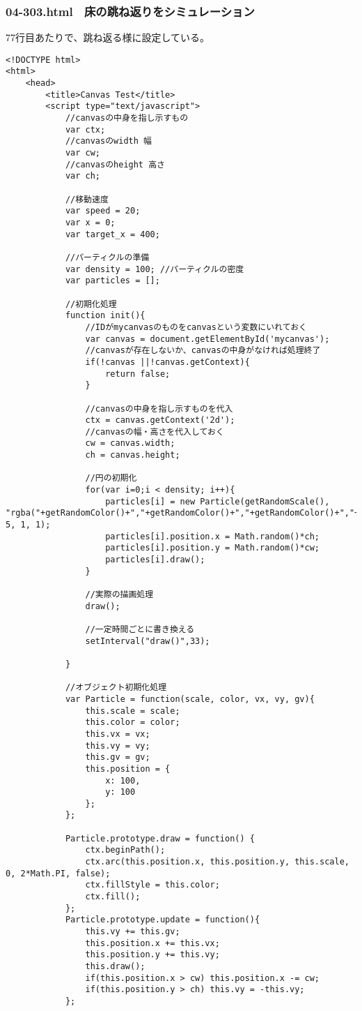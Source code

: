 \documentclass[mingoth,11pt,a4j,uplatex]{jsarticle}
\begin{document}
\subsubsection{04-303.html　床の跳ね返りをシミュレーション}
77行目あたりで、跳ね返る様に設定している。
\begin{lstlisting}[caption=床の跳ね返りをシミュレーション]
<!DOCTYPE html>
<html>
	<head>
		<title>Canvas Test</title>
		<script type="text/javascript">
			//canvasの中身を指し示すもの
			var ctx;
			//canvasのwidth 幅
			var cw;
			//canvasのheight 高さ
			var ch;
			
			//移動速度
			var speed = 20;
			var x = 0;
			var target_x = 400;
			
			//パーティクルの準備
			var density = 100; //パーティクルの密度
			var particles = [];
			
			//初期化処理
			function init(){
				//IDがmycanvasのものをcanvasという変数にいれておく
				var canvas = document.getElementById('mycanvas');
				//canvasが存在しないか、canvasの中身がなければ処理終了
				if(!canvas ||!canvas.getContext){
					return false;
				}
				
				//canvasの中身を指し示すものを代入
				ctx = canvas.getContext('2d');
				//canvasの幅・高さを代入しておく
				cw = canvas.width;
				ch = canvas.height;
				
				//円の初期化
				for(var i=0;i < density; i++){
					particles[i] = new Particle(getRandomScale(), "rgba("+getRandomColor()+","+getRandomColor()+","+getRandomColor()+","+getRandomAlpha()+")", 5, 1, 1);
					particles[i].position.x = Math.random()*ch;
					particles[i].position.y = Math.random()*cw;
					particles[i].draw();			
				}
				
				//実際の描画処理
				draw();
				
				//一定時間ごとに書き換える
				setInterval("draw()",33);

			}
			
			//オブジェクト初期化処理
			var Particle = function(scale, color, vx, vy, gv){
				this.scale = scale;
				this.color = color;
				this.vx = vx;
				this.vy = vy;
				this.gv = gv;
				this.position = {
					x: 100,
					y: 100
				};
			};
			
			Particle.prototype.draw = function() {
				ctx.beginPath();
				ctx.arc(this.position.x, this.position.y, this.scale, 0, 2*Math.PI, false);
				ctx.fillStyle = this.color;
				ctx.fill();
			};
			Particle.prototype.update = function(){
				this.vy += this.gv;
				this.position.x += this.vx;
				this.position.y += this.vy;
				this.draw();
				if(this.position.x > cw) this.position.x -= cw;
				if(this.position.y > ch) this.vy = -this.vy;
			};
			

\end{lstlisting}
\end{document}
